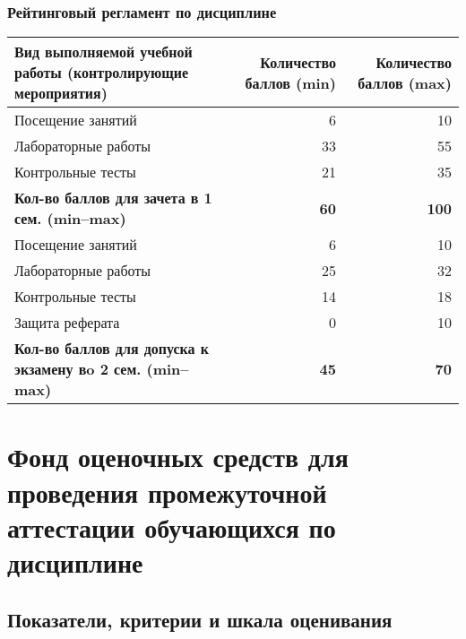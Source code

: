 \documentclass[a4paper,12pt]{article}
\begin{document}
\subsubsection*{Рейтинговый регламент по дисциплине}
\begin{longtable}{|>{\raggedright\arraybackslash}p{110mm}|r|r|}
\hline
\centering\arraybackslash Вид выполняемой учебной работы (контролирующие мероприятия) & 
\multicolumn{1}{p{20mm}|}{\centering\arraybackslash Количество баллов (min)} & 
\multicolumn{1}{p{20mm}|}{\centering\arraybackslash Количество баллов (max)} \\
\hline
Посещение занятий   & 6  & 10 \\ 
\hline
Лабораторные работы & 33 & 55 \\ 
\hline
Контрольные тесты   & 21 & 35 \\ 
\hline
\bf Кол-во баллов для зачета в 1 сем. (min--max) & \bf 60 & \bf 100 \\ 
\hline
Посещение занятий   & 6  & 10 \\ 
\hline
Лабораторные работы & 25 & 32 \\ 
\hline
Контрольные тесты   & 14 & 18 \\ 
\hline
Защита реферата     &  0 & 10 \\ 
\hline
\bf Кол-во баллов для допуска к экзамену вo 2 сем. (min--max) & \bf 45 & \bf 70 \\ 

\hline
\end{longtable}

\newpage
\section{Фонд оценочных средств для проведения промежуточной аттестации обучающихся по дисциплине}

\subsection{Показатели, критерии и шкала оценивания}
\end{document}
